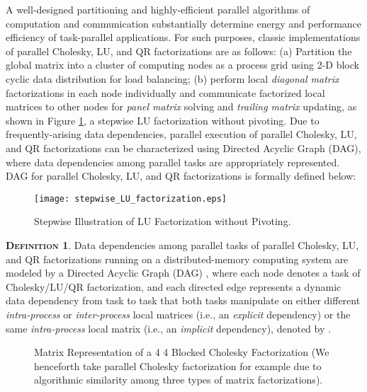 \documentclass[12pt]{elsarticle}
\begin{document}
A well-designed partitioning and highly-efficient parallel algorithms of computation and communication substantially determine energy and performance efficiency of task-parallel applications. For such purposes, classic implementations of parallel Cholesky, LU, and QR factorizations are as follows: (a) Partition the global matrix into a cluster of computing nodes as a process grid using 2-D block cyclic data distribution \cite{ics11} for load balancing; (b) perform local \emph{diagonal matrix} factorizations in each node individually and communicate factorized local matrices to other nodes for \emph{panel matrix} solving and \emph{trailing matrix} updating, as shown in Figure \ref{stepwise_LU_factorization}, a stepwise LU factorization without pivoting. Due to frequently-arising data dependencies, parallel execution of parallel Cholesky, LU, and QR factorizations can be characterized using Directed Acyclic Graph (DAG), where data dependencies among parallel tasks are appropriately represented. DAG for parallel Cholesky, LU, and QR factorizations is formally defined below:

\begin{figure}[h]
\centering
\texttt{[image: stepwise\_LU\_factorization.eps]}\\
\caption{Stepwise Illustration of LU Factorization without Pivoting.}
\label{stepwise_LU_factorization}
\end{figure}

\vspace{1mm}
\noindent\textsc{\textbf{Definition 1}}. Data dependencies among parallel tasks of parallel Cholesky, LU, and QR factorizations running on a distributed-memory computing system are modeled by a Directed Acyclic Graph (DAG) , where each node  denotes a task of Cholesky/LU/QR factorization, and each directed edge  represents a dynamic data dependency from task  to task  that both tasks manipulate on either different \emph{intra-process} or \emph{inter-process} local matrices (i.e., an \emph{explicit} dependency) or the same \emph{intra-process} local matrix (i.e., an \emph{implicit} dependency), denoted by .

\begin{comment}

\end{comment}

\begin{figure*}\scriptsize 
\caption{Matrix Representation of a 4  4 Blocked Cholesky Factorization (We henceforth take parallel Cholesky factorization for example due to algorithmic similarity among three types of matrix factorizations).}
\label{Cholesky_matrix}
\end{figure*}
\end{document}
